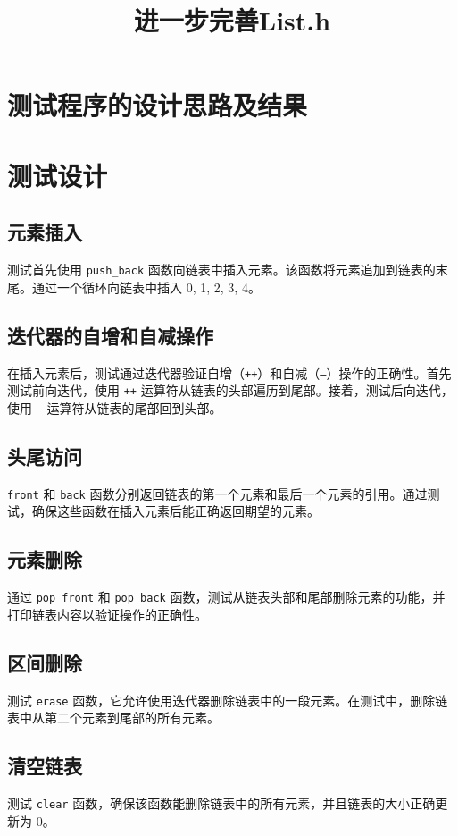 \documentclass[UTF8]{ctexart}
\begin{document}
\title{进一步完善List.h}

\pagestyle{fancy}
\fancyhead{}

\section*{测试程序的设计思路及结果}
\section{测试设计}
\subsection{元素插入}
测试首先使用 \texttt{push\_back} 函数向链表中插入元素。该函数将元素追加到链表的末尾。通过一个循环向链表中插入 0, 1, 2, 3, 4。

\subsection{迭代器的自增和自减操作}
在插入元素后，测试通过迭代器验证自增（\texttt{++}）和自减（\texttt{--}）操作的正确性。首先测试前向迭代，使用 \texttt{++} 运算符从链表的头部遍历到尾部。接着，测试后向迭代，使用 \texttt{--} 运算符从链表的尾部回到头部。

\subsection{头尾访问}
\texttt{front} 和 \texttt{back} 函数分别返回链表的第一个元素和最后一个元素的引用。通过测试，确保这些函数在插入元素后能正确返回期望的元素。

\subsection{元素删除}
通过 \texttt{pop\_front} 和 \texttt{pop\_back} 函数，测试从链表头部和尾部删除元素的功能，并打印链表内容以验证操作的正确性。

\subsection{区间删除}
测试 \texttt{erase} 函数，它允许使用迭代器删除链表中的一段元素。在测试中，删除链表中从第二个元素到尾部的所有元素。

\subsection{清空链表}
测试 \texttt{clear} 函数，确保该函数能删除链表中的所有元素，并且链表的大小正确更新为 0。
\end{document}

